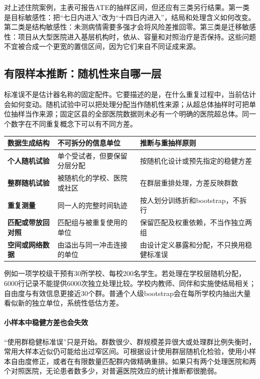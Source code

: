 对上述住院案例，主表可报告ATE的抽样区间，但还应有三类另行结果。第一类是目标敏感性：把“七日内进入”改为“十四日内进入”，结局和处理含义如何改变。第二类是结构敏感性：未测病情需要多强才会将风险差推回零。第三类是迁移敏感性：项目从大型医院进入基层机构时，依从、容量和对照治疗是否保持。这些问题不宜被合成一个更宽的置信区间，因为它们来自不同证成来源。

\subsection{有限样本推断：随机性来自哪一层}

标准误不是估计器名称的固定配件。它要描述的是，在什么重复过程中，当前估计会如何变动。随机试验中可以把处理分配当作随机性来源；从超总体抽样时可把单位抽样当作来源；固定区县的全部医院数据则未必有一个明确的医院超总体。同一个数字在不同重复概念下可以有不同方差。

\begin{center}
\small
\begin{tabularx}{\textwidth}{>{\bfseries}p{2.4cm}X X}
\toprule
数据生成结构 & 不可拆分的信息单位 & 推断与重抽样原则\\
\midrule
个人随机试验 & 单个受试者，但要保留分层分配 & 按随机化设计或预先指定的稳健方差\\
整群随机试验 & 被随机化的学校、医院或社区 & 在群层重排处理，方差反映群数\\
重复测量 & 同一人的完整时间轨迹 & 按人划分训练折和bootstrap，不拆行\\
匹配或带放回对照 & 匹配组与被重复使用的单位 & 保留匹配及权重依赖，不当作独立两组\\
空间或网络数据 & 由溢出与同一冲击连接的单位 & 由设计定义暴露和分配，不只换用稳健标准误\\
\bottomrule
\end{tabularx}
\end{center}

例如一项学校级干预有30所学校、每校200名学生。若处理在学校层随机分配，6000行记录不能提供6000次独立处理比较。学校内教师、同伴和实施使结局相关；自由度与有效信息更接近30个群。普通个人级bootstrap会在每所学校内抽出大量看似新的独立单位，系统性低估方差。

\paragraph{小样本中稳健方差也会失效}

“使用群稳健标准误”只是开始。群数很少、群规模差异很大或处理群比例失衡时，常用大样本近似仍可能给出过窄区间。可根据设计使用群层随机化检验，使用小样本自由度修正，或者在有限数量匹配群内做精确重排。如果只有两个处理医院和两个对照医院，无论患者数多少，对普遍医院效应的统计推断都很脆弱。

